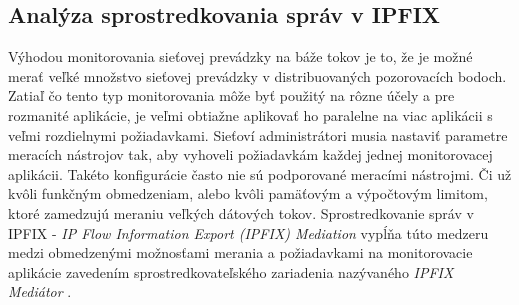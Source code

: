 \subsection{Anal\'yza sprostredkovania spr\'av v IPFIX}

Výhodou monitorovania sieťovej prevádzky na báže tokov je to, že je možné merať 
veľké množstvo sieťovej prevádzky v distribuovaných pozorovacích bodoch. 
Zatiaľ čo tento typ monitorovania môže byť použitý na rôzne účely a pre rozmanité aplikácie, je veľmi 
obtiažne aplikovať ho paralelne na viac aplikácii s veľmi rozdielnymi požiadavkami.
Sieťoví administrátori musia nastaviť parametre meracích nástrojov tak, aby vyhoveli požiadavkám každej
jednej monitorovacej aplikácii. Takéto konfigurácie často nie sú podporované meracími nástrojmi. Či už
kvôli funkčným obmedzeniam, alebo kvôli pamäťovým a výpočtovým limitom, ktoré zamedzujú meraniu veľkých 
dátových tokov. Sprostredkovanie správ v IPFIX - \emph{IP Flow Information Export (IPFIX) Mediation}
vypĺňa túto medzeru medzi obmedzenými možnosťami merania a požiadavkami na monitorovacie aplikácie 
zavedením sprostredkovateľského zariadenia nazývaného \emph{IPFIX Mediátor} \citep{rfc5982}.

